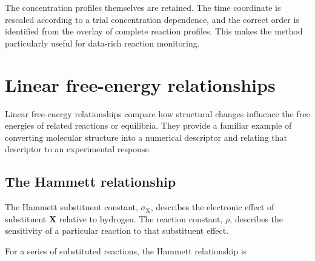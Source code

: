 {{%
  }
}

\begin{conceptbox}
  The concentration profiles themselves are retained.
  The time coordinate is rescaled according to a trial concentration dependence, and the correct order is identified from the overlay of complete reaction profiles.
  This makes the method particularly useful for data-rich reaction monitoring.
\end{conceptbox}

\section{Linear free-energy relationships}

Linear free-energy relationships compare how structural changes influence the free energies of related reactions or equilibria.
They provide a familiar example of converting molecular structure into a numerical descriptor and relating that descriptor to an experimental response.

\subsection{The Hammett relationship}

The Hammett substituent constant, $\sigma_{\mathrm{X}}$, describes the electronic effect of substituent \textbf{X} relative to hydrogen.
The reaction constant, $\rho$, describes the sensitivity of a particular reaction to that substituent effect.

For a series of substituted reactions, the Hammett relationship is


